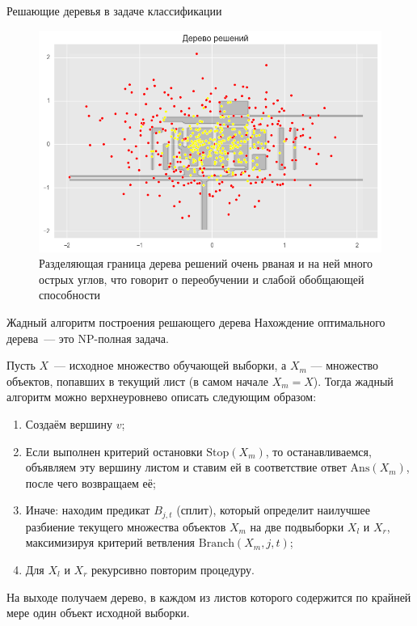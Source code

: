 \documentclass[notheorems, handout]{beamer}
\begin{document}
\begin{frame}{Решающие деревья в задаче классификации}
  \begin{figure}[h!]
    \includegraphics[width=0.9 \textwidth]{img/cltree2}
    \caption{Разделяющая граница дерева решений очень рваная и на ней
      много острых углов, что говорит о переобучении и слабой
    обобщающей способности}
  \end{figure}
\end{frame}

\begin{frame}{Жадный алгоритм построения решающего дерева}
  Нахождение оптимального дерева~--- это NP-полная задача.

  Пусть $X$~--- исходное множество обучающей выборки, а $X _m$ —
  множество объектов, попавших в текущий лист (в самом начале $X _m =
  X$). Тогда жадный алгоритм можно верхнеуровнево описать следующим образом:

  \begin{enumerate}
    \item Создаём вершину $v$;
    \item Если выполнен критерий остановки $\mathrm{Stop}(X _m)$, то
      останавливаемся, объявляем эту вершину листом и ставим ей в
      соответствие ответ $\mathrm{Ans}(X _m)$, после чего возвращаем её;
    \item Иначе: находим предикат $B _{j, t}$ (сплит), который
      определит наилучшее разбиение текущего множества объектов $X
      _m$ на две подвыборки $X _l$ и $X _r$, максимизируя критерий
      ветвления $\mathrm{Branch}(X _m, j, t)$;
    \item Для $X _l$ и $X _r$ рекурсивно повторим процедуру.
  \end{enumerate}

  На выходе получаем дерево, в каждом из листов которого содержится
  по крайней мере один объект исходной выборки.
\end{frame}
\end{document}
